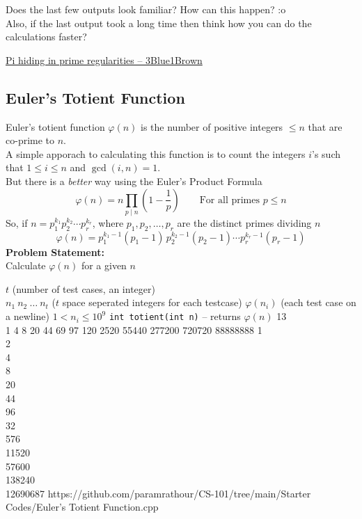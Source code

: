 \begin{noteI}
Does the last few outputs look familiar? How can this happen? :o\\
Also, if the last output took a long time then think how you can do the calculations faster?
\end{noteI}
\begin{funvideo}
\href{https://youtu.be/NaL_Cb42WyY}{Pi hiding in prime regularities -- 3Blue1Brown}
\end{funvideo}
\subsection{Euler's Totient Function}\label{pp:eulertotient}
Euler's totient function $\varphi(n)$ is the number of positive integers $\leq n$ that are co-prime to $n$.\\
A simple apporach to calculating this function is to count the integers $i$'s such that $1\leq i\leq n$ and $\gcd(i,n) = 1$.\\
But there is a \emph{better} way using the Euler's Product Formula
\begin{equation}
	\varphi (n)=n\prod _{p\mid n}\left(1-{\frac {1}{p}}\right)\qquad\text{For all primes $p\leq n$}
\end{equation}
So, if  ${\displaystyle n=p_{1}^{k_{1}}p_{2}^{k_{2}}\cdots p_{r}^{k_{r}}}$, where ${\displaystyle p_{1},p_{2},\ldots ,p_{r}}$ are the distinct primes dividing $n$
\begin{equation*}
	{\displaystyle \varphi (n)=p_{1}^{k_{1}-1}(p_{1}{-}1)\,p_{2}^{k_{2}-1}(p_{2}{-}1)\cdots p_{r}^{k_{r}-1}(p_{r}{-}1)}
\end{equation*}
\textbf{Problem Statement:}\\
Calculate $\varphi(n)$ for a given $n$

\begin{testcasesFunction}
	{$t$ \hfill(number of test cases, an integer)\\
	$n_1\ n_2\ \ldots\ n_t$ \hfill($t$ space seperated integers for each testcase)}
	{$\varphi(n_i)$ \hfill(each test case on a newline)}
	{$1 < n_i \leq 10^{9}$}
	{\texttt{int totient(int n)} -- returns $\varphi(n)$}
	{13\\1 4 8 20 44 69 97 120 2520 55440 277200 720720 88888888}
	{1\\2\\4\\8\\20\\44\\96\\32\\576\\11520\\57600\\138240\\12690687}
	{https://github.com/paramrathour/CS-101/tree/main/Starter Codes/Euler's Totient Function.cpp}
\end{testcasesFunction}
